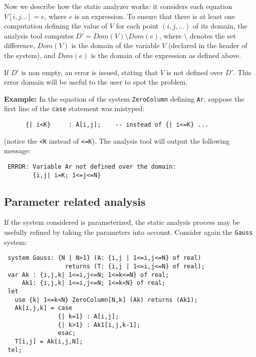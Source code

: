  Now we
describe how the static analyzer works: it considers each equation
$V[i,j\ldots] = e$, where $e$ is an {\alfa} expression.  To ensure
that there is at least one computation defining the value of $V$ for
each point $(i,j,\ldots)$ of its domain, the analysis tool computes
$D' = Dom({V}) \setminus Dom({e})$, where $\setminus$ denotes the set
difference, $Dom(V)$ is the domain of the variable $V$ (declared in
the header of the system), and $Dom(e)$ is the domain of the
expression as defined above.
 
If $D'$ is non empty, an error is issued, stating that $V$ is not
defined over $D'$. This error domain will be useful to the user to
spot the problem. 

\textbf{Example:} In the equation of the system \texttt{ZeroColumn} 
 defining \texttt{Ar}, 
suppose the first line of the \texttt{case} statement was mistyped:
\begin{verbatim}
      {| i<K}     : A[i,j];    -- instead of {| i<=K} ...
\end{verbatim} 
(notice the \verb~<K~ instead of \verb~<=K~). The analysis tool will output
 the following message:
\begin{verbatim}
 ERROR: Variable Ar not defined over the domain:
        {i,j| i=K; 1<=j<=N}
\end{verbatim} 




\subsection{Parameter related analysis\label{param-check}}

If the system considered is parameterized, the static analysis process
may be usefully refined by taking the parameters into
account. Consider again the \texttt{Gauss} system:

\begin{verbatim}
 system Gauss: {N | N>1} (A: {i,j | 1<=i,j<=N} of real)
                 returns (T: {i,j | 1<=i,j<=N} of real);
 var Ak : {i,j,k| 1<=i,j<=N; 1<=k<=N} of real;
     Ak1: {i,j,k| 1<=i,j<=N; 1<=k<N} of real;
 let
   use {k| 1<=k<N} ZeroColumn[N,k] (Ak) returns (Ak1);
   Ak[i,j,k] = case
               {| k=1} : A[i,j];
               {| k>1} : Ak1[i,j,k-1];
               esac;
   T[i,j] = Ak[i,j,N];
 tel;
\end{verbatim} 


